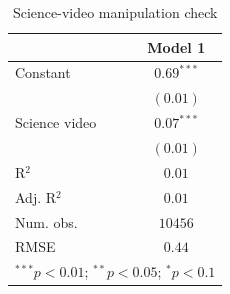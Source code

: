 
\begin{table}
\begin{center}
\begin{tabular}{l c}
\hline
 & Model 1 \\
\hline
Constant      & $0.69^{***}$ \\
              & $(0.01)$     \\
Science video & $0.07^{***}$ \\
              & $(0.01)$     \\
\hline
R$^2$         & $0.01$       \\
Adj. R$^2$    & $0.01$       \\
Num. obs.     & $10456$      \\
RMSE          & $0.44$       \\
\hline
\multicolumn{2}{l}{\scriptsize{$^{***}p<0.01$; $^{**}p<0.05$; $^{*}p<0.1$}}
\end{tabular}
\caption{Science-video manipulation check}
\label{tab:man_science}
\end{center}
\end{table}


